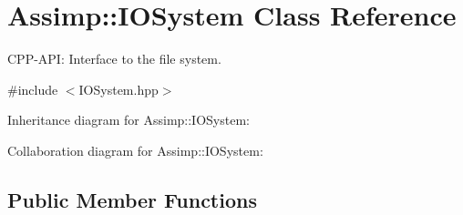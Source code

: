 \hypertarget{class_assimp_1_1_i_o_system}{\section{Assimp\-:\-:I\-O\-System Class Reference}
\label{class_assimp_1_1_i_o_system}
}


C\-P\-P-\/\-A\-P\-I\-: Interface to the file system.  




{\ttfamily \#include $<$I\-O\-System.\-hpp$>$}



Inheritance diagram for Assimp\-:\-:I\-O\-System\-:


Collaboration diagram for Assimp\-:\-:I\-O\-System\-:
\subsection*{Public Member Functions}
